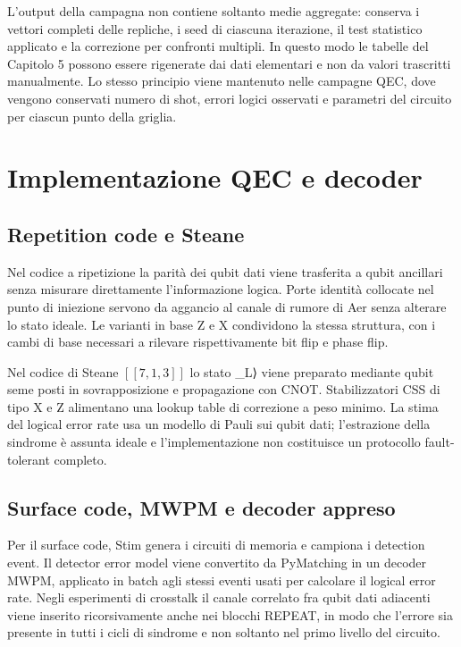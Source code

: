 L'output della campagna non contiene soltanto medie aggregate: conserva i vettori completi delle repliche, i seed di ciascuna iterazione, il test statistico applicato e la correzione per confronti multipli. In questo modo le tabelle del Capitolo 5 possono essere rigenerate dai dati elementari e non da valori trascritti manualmente. Lo stesso principio viene mantenuto nelle campagne QEC, dove vengono conservati numero di shot, errori logici osservati e parametri del circuito per ciascun punto della griglia.

\section{Implementazione QEC e decoder}\label{sec:finale_4_6}

\subsection{Repetition code e Steane}\label{sec:finale_4_6_1}

Nel codice a ripetizione la parità dei qubit dati viene trasferita a qubit ancillari senza misurare direttamente l'informazione logica. Porte identità collocate nel punto di iniezione servono da aggancio al canale di rumore di Aer senza alterare lo stato ideale. Le varianti in base Z e X condividono la stessa struttura, con i cambi di base necessari a rilevare rispettivamente bit flip e phase flip.

Nel codice di Steane \ensuremath{[[7,1,3]]} lo stato \_L⟩ viene preparato mediante qubit seme posti in sovrapposizione e propagazione con CNOT. Stabilizzatori CSS di tipo X e Z alimentano una lookup table di correzione a peso minimo. La stima del logical error rate usa un modello di Pauli sui qubit dati; l'estrazione della sindrome è assunta ideale e l'implementazione non costituisce un protocollo fault-tolerant completo.

\subsection{Surface code, MWPM e decoder appreso}\label{sec:finale_4_6_2}

Per il surface code, Stim genera i circuiti di memoria e campiona i detection event. Il detector error model viene convertito da PyMatching in un decoder MWPM, applicato in batch agli stessi eventi usati per calcolare il logical error rate. Negli esperimenti di crosstalk il canale correlato fra qubit dati adiacenti viene inserito ricorsivamente anche nei blocchi REPEAT, in modo che l'errore sia presente in tutti i cicli di sindrome e non soltanto nel primo livello del circuito.

